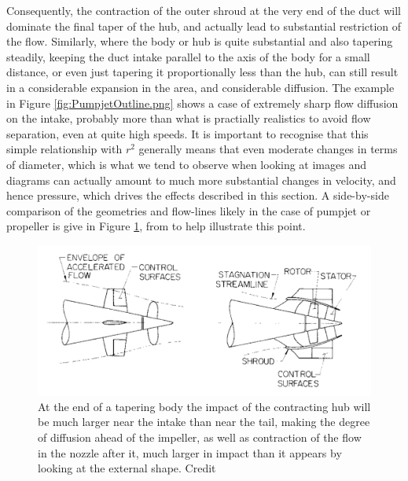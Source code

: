 \documentclass{article}\usepackage[]{graphicx}\usepackage[]{color}
\begin{document}
Consequently, the contraction of the outer shroud at the very end of the duct will dominate the final taper of the hub, and actually lead to substantial restriction of the flow.  Similarly, where the body or hub is quite substantial and also tapering steadily, keeping the duct intake parallel to the axis of the body for a small distance, or even just tapering it proportionally less than the hub, can still result in a considerable expansion in the area, and considerable diffusion.  The example in Figure \ref{fig:PumpjetOutline.png} shows a case of extremely sharp flow diffusion on the intake, probably more than what is practially realistics to avoid flow separation, even at quite high speeds. It is important to recognise that this simple relationship with $r^2$ generally means that even moderate changes in terms of diameter, which is what we tend to observe when looking at images and diagrams can actually amount to much more substantial changes in velocity, and hence pressure, which drives the effects described in this section.  A side-by-side comparison of the geometries and flow-lines likely in the case of pumpjet or propeller is give in Figure \ref{fig:Comparison.png}, from  to help illustrate this point.

\begin{figure}
\includegraphics[width=\textwidth]{Comparison.png}
\caption{At the end of a tapering body the impact of the contracting hub will be much larger near the intake than near the tail, making the degree of diffusion ahead of the impeller, as well as contraction of the flow in the nozzle after it, much larger in impact than it appears by looking at the external shape. Credit \cite{gearhart1966selection}}
\label{fig:Comparison.png}
\end{figure}
\end{document}
